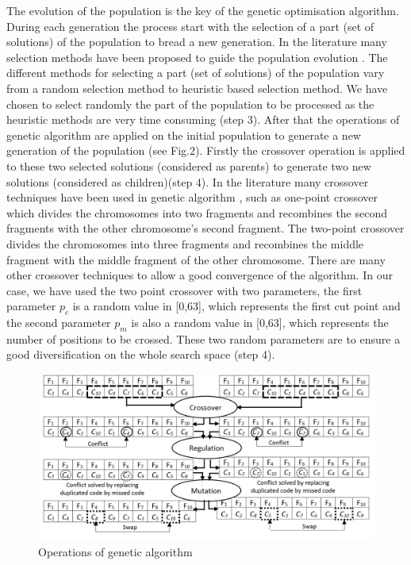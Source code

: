 \documentclass{singlecol-new}
\theoremstyle{TH}{
\newtheorem{lemma}{Lemma}
\newtheorem{theorem}[lemma]{Theorem}
\newtheorem{corrolary}[lemma]{Corrolary}
\newtheorem{conjecture}[lemma]{Conjecture}
\newtheorem{proposition}[lemma]{Proposition}
\newtheorem{claim}[lemma]{Claim}
\newtheorem{stheorem}[lemma]{Wrong Theorem}
}
\theoremstyle{THrm}{
\newtheorem{definition}{Definition}
\newtheorem{question}{Question}
\newtheorem{remark}{Remark}
\newtheorem{scheme}{Scheme}
}
\theoremstyle{THhit}{
\newtheorem{case}{Case}[section]
}
\begin{document}
The evolution of the population is the key of the genetic optimisation algorithm. During each generation the process start with the selection of a part (set of solutions) of the population to bread a new generation. In the literature many selection methods have been proposed to guide the population evolution \citep{bli95}. The different methods for selecting a part (set of solutions) of the population vary from a random selection method to heuristic based selection method. We have chosen to select randomly the part of the population to be processed as the heuristic methods are very time consuming (step 3).
After that the operations of genetic algorithm are applied on the initial population to generate a new generation of the population (see Fig.2). Firstly the crossover operation is applied to these two selected solutions (considered as parents) to generate two new solutions (considered as children)(step 4). In the literature many crossover techniques have been used in genetic algorithm \citep{osa14}, such as one-point crossover which divides the chromosomes into two fragments and recombines the second fragments with the other chromosome's second fragment. The two-point crossover divides the chromosomes into three fragments and recombines the middle fragment with  the middle fragment of the other chromosome. There are many other crossover techniques to allow a good convergence of the algorithm. In our case, we have used the two point crossover with two parameters, the first parameter $p_{c}$ is a random value in [0,63], which represents the first cut point and the second parameter $p_{m}$ is also a random value in [0,63], which represents the number of positions to be crossed. These two random parameters are to ensure a good diversification on the whole search space (step 4).

\begin{figure}[h]
\caption{Operations of genetic algorithm}
\begin{center}
\includegraphics[scale=0.4]{Images/Drawing2.jpg}
\end{center}
\label{Fig3}
\end{figure}
\end{document}
